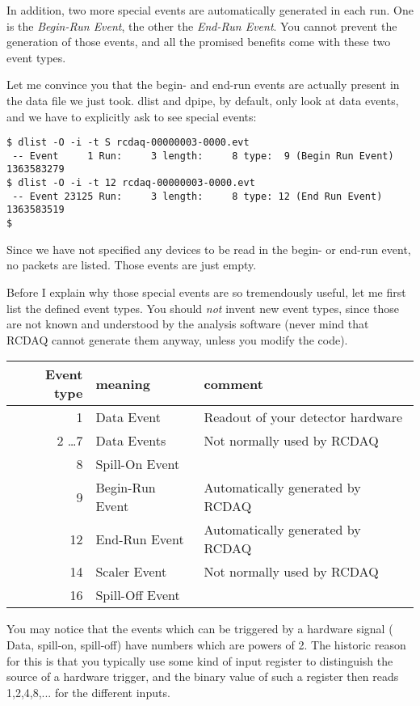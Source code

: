 \documentclass{article}[11pt]
\begin{document}
In addition, two more special events are automatically generated in
each run.  One is the \emph{Begin-Run Event}, the other the
\emph{End-Run Event}. You cannot prevent the generation of those
events, and all the promised benefits come with these two event types.

Let me convince you that the begin- and end-run events are actually present in
the data file we just took. dlist and dpipe, by default, only look at
data events, and we have to explicitly ask to see special events:

\begin{verbatim}
$ dlist -O -i -t S rcdaq-00000003-0000.evt
 -- Event     1 Run:     3 length:     8 type:  9 (Begin Run Event)  1363583279
$ dlist -O -i -t 12 rcdaq-00000003-0000.evt
 -- Event 23125 Run:     3 length:     8 type: 12 (End Run Event)  1363583519
$ 
\end{verbatim}

Since we have not specified any devices to be read in the begin- or end-run event,
no packets are listed. Those events are just empty.

Before I explain why those special events are so tremendously useful,
let me first list the defined event types. You should \emph{not}
invent new event types, since those are not known and understood by the
analysis software (never mind that RCDAQ cannot generate them anyway,
unless you modify the code).

\begin{center}
\begin{tabular}{|r|l|l|}
\hline
Event type & meaning & comment \\
\hline
\hline
    1 & Data Event &  Readout of your detector hardware\\ \hline
    2 \dots 7 & Data Events & Not normally used by RCDAQ \\ \hline
    8  & Spill-On Event &  \\ \hline
    9  & Begin-Run Event & Automatically generated by RCDAQ \\ \hline
    12 & End-Run Event & Automatically generated by RCDAQ  \\ \hline
    14 & Scaler Event  & Not normally used by RCDAQ \\ \hline
    16 & Spill-Off Event  &  \\ \hline
\hline
\end{tabular}
\end{center}

You may notice that the events which can be triggered by a hardware
signal ( Data, spill-on, spill-off) have numbers which are powers of
2. The historic reason for this is that you typically use some kind of
input register to distinguish the source of a hardware trigger, and
the binary value of such a register then reads 1,2,4,8,... for the different
inputs.
\end{document}
